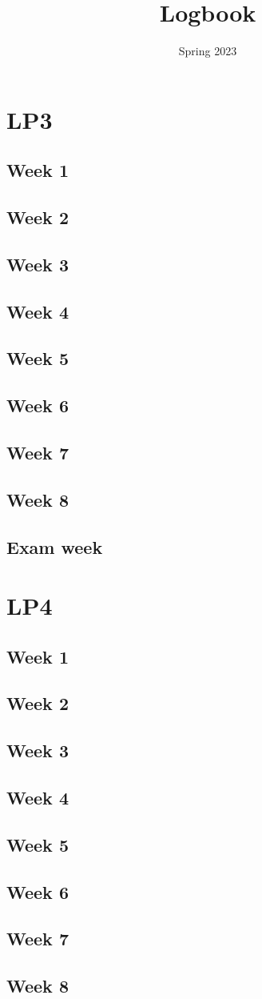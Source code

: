 \documentclass{article}
\title{Logbook}
\date{Spring 2023}
\newcommand{\logentry}[2]{
    \subsection{Week #2}
    
    \newpage
}
\newcommand{\customlogentry}[3]{
    \subsection{#3}
    
    \newpage
}
\begin{document}
\maketitle
\newpage
\tableofcontents
\newpage


\section{LP3}
    \logentry{3}{1}
    \logentry{3}{2}
    \logentry{3}{3}
    \logentry{3}{4}
    \logentry{3}{5}
    \logentry{3}{6}
    \logentry{3}{7}
    \logentry{3}{8}
    \customlogentry{3}{Exam}{Exam week}

\section{LP4}
    \logentry{4}{1}
    \logentry{4}{2}
    \logentry{4}{3}
    \logentry{4}{4}
    \logentry{4}{5}
    \logentry{4}{6}
    \logentry{4}{7}
    \logentry{4}{8}
    
\end{document}
